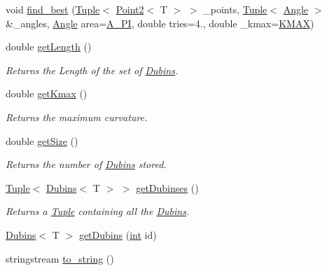 \begin{DoxyCompactItemize}
void \mbox{\hyperlink{class_dubins_set_a12ea86c3250f8fff7a5db2d759cde33d}{find\+\_\+best}} (\mbox{\hyperlink{class_tuple}{Tuple}}$<$ \mbox{\hyperlink{class_point2}{Point2}}$<$ T $>$ $>$ \+\_\+points, \mbox{\hyperlink{class_tuple}{Tuple}}$<$ \mbox{\hyperlink{class_angle}{Angle}} $>$ \&\+\_\+angles, \mbox{\hyperlink{class_angle}{Angle}} area=\mbox{\hyperlink{maths_8hh_ad7760000c41920a1ae5cf0f6bf0e4c77}{A\+\_\+PI}}, double tries=4., double \+\_\+kmax=\mbox{\hyperlink{dubins_8hh_a940b85a83458e94519f2685b33ddd276}{K\+M\+AX}})
\item 
double \mbox{\hyperlink{class_dubins_set_ad491b5f7e71c3db5ffed11643d2d4e4c}{get\+Length}} ()
\begin{DoxyCompactList}\small\item\em Returns the Length of the set of {\ttfamily \mbox{\hyperlink{class_dubins}{Dubins}}}. \end{DoxyCompactList}\item 
double \mbox{\hyperlink{class_dubins_set_af97fa42a6a9a6325c4d1ed4541758272}{get\+Kmax}} ()
\begin{DoxyCompactList}\small\item\em Returns the maximum curvature. \end{DoxyCompactList}\item 
double \mbox{\hyperlink{class_dubins_set_a41f7dbb6b82c8822e427ee1a3059b8ca}{get\+Size}} ()
\begin{DoxyCompactList}\small\item\em Returns the number of {\ttfamily \mbox{\hyperlink{class_dubins}{Dubins}}} stored. \end{DoxyCompactList}\item 
\mbox{\hyperlink{class_tuple}{Tuple}}$<$ \mbox{\hyperlink{class_dubins}{Dubins}}$<$ T $>$ $>$ \mbox{\hyperlink{class_dubins_set_a2d0216573331d2ca6bf36ea213c4d434}{get\+Dubinses}} ()
\begin{DoxyCompactList}\small\item\em Returns a {\ttfamily \mbox{\hyperlink{class_tuple}{Tuple}}} containing all the {\ttfamily \mbox{\hyperlink{class_dubins}{Dubins}}}. \end{DoxyCompactList}\item 
\mbox{\hyperlink{class_dubins}{Dubins}}$<$ T $>$ \mbox{\hyperlink{class_dubins_set_a421897996d88df8eb7dad214d7feb84b}{get\+Dubins}} (\mbox{\hyperlink{draw_8hh_aa620a13339ac3a1177c86edc549fda9b}{int}} id)
\item 
stringstream \mbox{\hyperlink{class_dubins_set_acfedfbe0ef1ff445cbaff93c70205f86}{to\+\_\+string}} ()
\end{DoxyCompactItemize}
